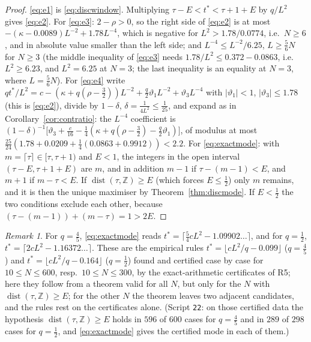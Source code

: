 \documentclass[11pt,a4paper]{article}
\theoremstyle{definition}
\theoremstyle{remark}
\newtheorem{remark}[theorem]{Remark}
\newcommand{\Z}{\mathbb{Z}}
\begin{document}
\begin{proof}
\eqref{eq:e1} is \eqref{eq:discwindow}. Multiplying $\tau-E<t^*<\tau+1+E$ by $q/L^2$ gives \eqref{eq:e2}.
For \eqref{eq:e3}: $2-\rho>0$, so the right side of \eqref{eq:e2} is at most $-(\kappa-0.0089)L^{-2}+1.78L^{-4}$,
which is negative for $L^2>1.78/0.0774$, i.e.\ $N\ge6$, and in absolute value smaller than the left side; and
$L^{-4}\le L^{-2}/6.25$, $L\ge\frac56N$ for $N\ge3$ (the middle inequality of \eqref{eq:e3} needs
$1.78/L^2\le0.372-0.0863$, i.e.\ $L^2\ge6.23$, and $L^2=6.25$ at $N=3$; the last inequality is an equality at $N=3$,
where $L=\frac56N$). For \eqref{eq:e4} write $qt^*/L^2=c-(\kappa+q(\rho-\frac32))L^{-2}
+\frac q2\vartheta_1L^{-2}+\vartheta_3L^{-4}$ with $|\vartheta_1|<1$, $|\vartheta_3|\le1.78$ (this is \eqref{eq:e2}),
divide by $1-\delta$, $\delta=\frac1{4L^2}\le\frac1{25}$, and expand as in Corollary~\ref{cor:contratio}:
the $L^{-4}$ coefficient is $(1-\delta)^{-1}\bigl[\vartheta_3+\frac c{16}-\frac14(\kappa+q(\rho-\frac32)-\frac q2\vartheta_1)\bigr]$,
of modulus at most $\frac{25}{24}(1.78+0.0209+\frac14(0.0863+0.9912))<2.2$. For \eqref{eq:exactmode}: with
$m=\lceil\tau\rceil\in[\tau,\tau+1)$ and $E<1$, the integers in the open interval $(\tau-E,\tau+1+E)$ are $m$, and in
addition $m-1$ if $\tau-(m-1)<E$, and $m+1$ if $m-\tau<E$. If $\operatorname{dist}(\tau,\Z)\ge E$ (which forces
$E\le\frac12$) only $m$ remains, and it is then the unique maximiser by Theorem~\ref{thm:discmode}. If $E<\frac12$ the two
conditions exclude each other, because $(\tau-(m-1))+(m-\tau)=1>2E$.
\end{proof}

\begin{remark}
For $q=\frac45$, \eqref{eq:exactmode} reads $t^*=\lceil\frac54cL^2-1.09902\ldots\rceil$, and for $q=\frac12$,
$t^*=\lceil2cL^2-1.16372\ldots\rceil$. These are the empirical rules
$t^*=\lfloor cL^2/q-0.099\rfloor$ ($q=\frac45$) and $t^*=\lfloor cL^2/q-0.164\rfloor$ ($q=\frac12$) found and certified
case by case for $10\le N\le600$, resp.\ $10\le N\le300$, by the exact-arithmetic certificates of R5;
here they follow from a theorem valid for all $N$, but only for the $N$ with $\operatorname{dist}(\tau,\Z)\ge E$; for the other $N$ the theorem leaves two adjacent candidates, and the rules rest on the certificates alone. %
(Script \texttt{22}: on those certified data the hypothesis $\operatorname{dist}(\tau,\Z)\ge E$ holds in
$596$ of $600$ cases for $q=\frac45$ and in $289$ of $298$ cases for $q=\frac12$, and \eqref{eq:exactmode} gives the
certified mode in each of them.)
\end{remark}
\end{document}
